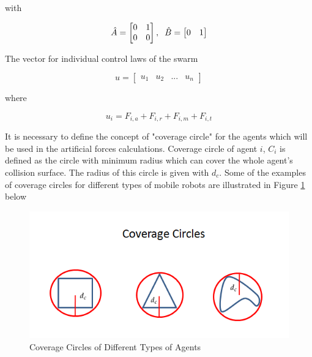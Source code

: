 with

\begin{equation}
\hat{A} = \begin{bmatrix}
0&1\\0&0
\end{bmatrix} , \hspace{0.2cm} \hat{B} = \begin{bmatrix}
0&1
\end{bmatrix}
\end{equation}
			
The vector for individual control laws of the swarm

\begin{equation}
u = \begin{bmatrix}
u_1 & u_2 & ... & u_n
\end{bmatrix}
\end{equation}

where

\begin{equation}
u_i = F_{i,a} + F_{i,r} + F_{i,m} + F_{i,t}
\end{equation}

It is necessary to define the concept of "coverage circle"	for the agents which will be used in the artificial forces calculations. Coverage circle of agent $i$, $C_i$ is defined as the circle with minimum radius which can cover the whole agent's collision surface. The radius of this circle is given with $d_c$. Some of the examples of coverage circles for different types of mobile robots are illustrated in Figure \ref{coverage_circle_ref} below
		
\begin{figure}[H]
\caption{Coverage Circles of Different Types of Agents} \label{coverage_circle_ref}
\centering
\includegraphics[scale = 0.60]{coverage_circles}
\end{figure}
		

